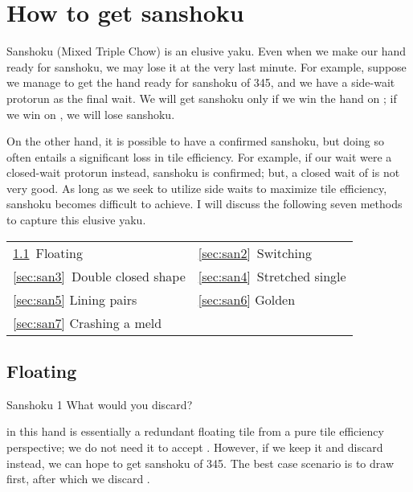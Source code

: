 \newpage
\section{How to get {\jap sanshoku}}  \label{sec:san}

{\jap Sanshoku} (Mixed Triple Chow) is an elusive {\jap yaku}. 
Even when we make our hand ready for {\jap sanshoku}, we may lose it at the very last minute. For example, suppose we manage to get the hand ready for {\jap sanshoku} of 345, and we have a side-wait protorun {\LARGE{}} as the final wait. We will get {\jap sanshoku} only if we win the hand on {\LARGE{}}; if we win on {\LARGE{}}, we will lose {\jap sanshoku}.

\bigskip
On the other hand, it is possible to have a confirmed {\jap sanshoku}, but doing so often entails a significant loss in tile efficiency. For example, if our wait were a closed-wait protorun {\LARGE{}} instead, {\jap sanshoku} is confirmed; but, a closed wait of {\LARGE{}} is not very good. As long as we seek to utilize side waits to maximize tile efficiency, {\jap sanshoku} becomes difficult to achieve. I will discuss the following seven methods to capture this elusive {\jap yaku}. 

\bigskip
\begin{tabular}{l l}
\ref{sec:san1}~Floating & \ref{sec:san2}~Switching\\
\ref{sec:san3}~Double closed shape & \ref{sec:san4}~Stretched single\\
\ref{sec:san5} Lining pairs &\ref{sec:san6} Golden\\
\ref{sec:san7} Crashing a meld\\
\end{tabular}

\newpage

\subsection{Floating}\label{sec:san1}

\begin{itembox}[r]{{\jap Sanshoku} 1}
\bp
{}\bei
\ep
\vspace{-10pt} What would you discard? \vspace{-5pt}
\end{itembox}
\noindent
{\LARGE{}} in this hand is essentially a redundant floating tile from a pure tile efficiency perspective; we do not need it to accept {\LARGE{}}. However, if we keep it and discard {\LARGE\bei} instead, we can hope to get {\jap sanshoku} of 345. The best case scenario is to draw {\LARGE{}} first, after which we discard {\LARGE{}}. 

